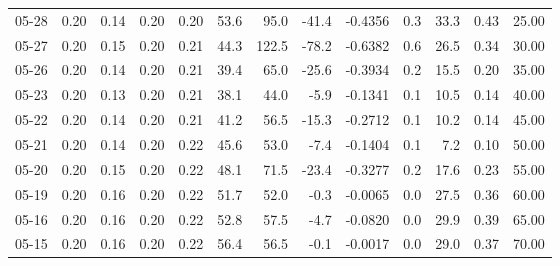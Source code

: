 \begin{threeparttable}
{\begin{tabular}{lrrrrrrrrrrrr}
  05-28 &          0.20 &          0.14 &          0.20 &        0.20 &                53.6 &                95.0 &      -41.4 &      -0.4356 &                 0.3 &             33.3 &            0.43 &                  25.00 \\
  05-27 &          0.20 &          0.15 &          0.20 &        0.21 &                44.3 &               122.5 &      -78.2 &      -0.6382 &                 0.6 &             26.5 &            0.34 &                  30.00 \\
  05-26 &          0.20 &          0.14 &          0.20 &        0.21 &                39.4 &                65.0 &      -25.6 &      -0.3934 &                 0.2 &             15.5 &            0.20 &                  35.00 \\
  05-23 &          0.20 &          0.13 &          0.20 &        0.21 &                38.1 &                44.0 &       -5.9 &      -0.1341 &                 0.1 &             10.5 &            0.14 &                  40.00 \\
  05-22 &          0.20 &          0.14 &          0.20 &        0.21 &                41.2 &                56.5 &      -15.3 &      -0.2712 &                 0.1 &             10.2 &            0.14 &                  45.00 \\
  05-21 &          0.20 &          0.14 &          0.20 &        0.22 &                45.6 &                53.0 &       -7.4 &      -0.1404 &                 0.1 &              7.2 &            0.10 &                  50.00 \\
  05-20 &          0.20 &          0.15 &          0.20 &        0.22 &                48.1 &                71.5 &      -23.4 &      -0.3277 &                 0.2 &             17.6 &            0.23 &                  55.00 \\
  05-19 &          0.20 &          0.16 &          0.20 &        0.22 &                51.7 &                52.0 &       -0.3 &      -0.0065 &                 0.0 &             27.5 &            0.36 &                  60.00 \\
  05-16 &          0.20 &          0.16 &          0.20 &        0.22 &                52.8 &                57.5 &       -4.7 &      -0.0820 &                 0.0 &             29.9 &            0.39 &                  65.00 \\
  05-15 &          0.20 &          0.16 &          0.20 &        0.22 &                56.4 &                56.5 &       -0.1 &      -0.0017 &                 0.0 &             29.0 &            0.37 &                  70.00 \\

\end{tabular}}
\end{threeparttable}
